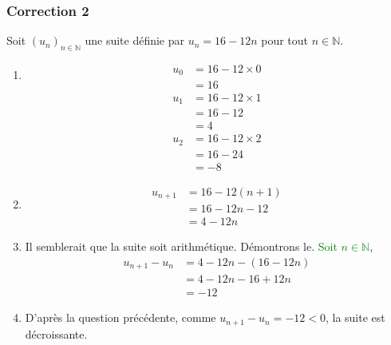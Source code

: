 \documentclass[15pt, mathserif]{beamer}
\newcommand{\N}{\mathbb{N}}			%
\newcommand{\st}[1]{$(#1_n)_{n \in \N}$}
\begin{document}
\begin{frame}
\vspace{-10mm}
	\frametitle{Correction 2}
\vspace*{0.5cm} 
 
 Soit \st{u} une suite définie par $u_n=16-12n$ pour tout $n \in \N$. 
 
 \begin{enumerate} 
 	 \item \begin{multicols}{3} 
 
 \begin{align*} 
 u_0 &=16-12\times 0 \\ &= 16\end{align*}  
 \columnbreak 
 \begin{align*} 
 u_1 &= 16-12\times 1 \\ 
 &= 16-12\\ 
 &= 4 
 \end{align*}  
 \columnbreak 
 \begin{align*} 
 u_2 &= 16-12\times 2 \\ 
 &= 16-24\\ 
 &= -8 
 \end{align*} 
 \end{multicols} 
 \vfil 
 	 \item \begin{align*} u_{n+1} &= 16-12(n+1) \\ &=  16-12n -12 \\ &=  4-12n 
 \end{align*} \end{enumerate} 
 
 \end{frame} 
 
 \begin{frame}  
 \begin{enumerate} \setcounter{enumi}{2}  
 	 \item Il semblerait que la suite soit arithmétique. Démontrons le.  \textcolor{green}{Soit $n \in \N$}, \begin{align*} 
 u_{n+1}-u_n &=  4-12n -\left(16-12n \right) \\ 
 &= 4-12n -16+12n \\ 
 &= -12 
 \end{align*} 
 \vfil 
 	 \item  D'après la question précédente, comme $u_{n+1}-u_n= -12<0$, la suite est décroissante.
 
 \end{enumerate} \end{frame}
\end{document}
